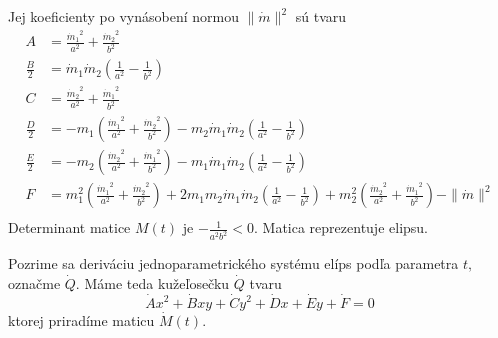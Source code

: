 Jej koeficienty po vynásobení normou $ \| \dot{m} \|^2$ sú tvaru
\begin{align*}
A &= \frac{{\dot{m}_1}^2}{a^2} + \frac{{\dot{m}_2}^2}{b^2} \\
\frac{B}{2} &= \dot{m}_1 \dot{m}_2 \left( \frac{1}{a^2} - \frac{1}{b^2} \right) \\
C &= \frac{{\dot{m}_2}^2}{a^2} + \frac{{\dot{m}_1}^2}{b^2} \\
\frac{D}{2} &= - m_1 \left( \frac{{\dot{m}_1}^2}{a^2} + \frac{{\dot{m}_2}^2}{b^2} \right) - m_2 \dot{m}_1 \dot{m}_2 \left(\frac{1}{a^2} - \frac{1}{b^2}\right) \\
\frac{E}{2} &= - m_2 \left( \frac{{\dot{m}_2}^2}{a^2} + \frac{{\dot{m}_1}^2}{b^2} \right) - m_1 \dot{m}_1 \dot{m}_2 \left( \frac{1}{a^2} - \frac{1}{b^2} \right) \\
F &= m_1^2 \left( \frac{{\dot{m}_1}^2}{a^2} + \frac{{\dot{m}_2}^2}{b^2} \right) + 2 m_1 m_2 \dot{m}_1 \dot{m}_2 \left( \frac{1}{a^2} - \frac{1}{b^2} \right) + m_2^2 \left( \frac{{\dot{m}_2}^2}{a^2} + \frac{{\dot{m}_1}^2}{b^2} \right) -  \| \dot{m}  \|^2 \\
\end{align*}
Determinant matice $M(t)$ je $ - \frac{1}{a^2b^2} < 0.$ Matica reprezentuje elipsu.

Pozrime sa deriváciu jednoparametrického systému elíps podľa parametra $t,$ označme $\dot{Q}$. Máme teda kužeľosečku $\dot{Q}$ tvaru 
$$
\dot{A}x^2 + \dot{B}xy + \dot{C}y^2 + \dot{D}x + \dot{E}y + \dot{F} = 0$$
ktorej priradíme maticu  $\dot{M}(t).$

